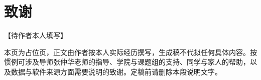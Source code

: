 \chapter*{致谢}

\noindent【待作者本人填写】

\noindent 本页为占位页，正文由作者按本人实际经历撰写，生成稿不代拟任何具体内容。按惯例可涉及导师张仲华老师的指导、学院与课题组的支持、同学与家人的帮助，以及数据与软件来源方面需要说明的致谢。定稿前请删除本段说明文字。

